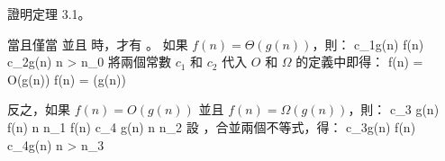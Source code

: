 \startEXERCISE
證明定理 3.1。

當且僅當  並且  時，才有 。
\stopEXERCISE
\startANSWER
如果 $f(n) = \Theta(g(n))$，則：
 \le c_1g(n) \le f(n) \le c_2g(n) \quad {} n > n_0
\stopformula
將兩個常數 $c_1$ 和 $c_2$ 代入 $O$ 和 $\Omega$ 的定義中即得：
\startsplitformula\startalign
\NC f(n) \NC = O(g(n)) \NR
\NC f(n) \NC = \Omega(g(n)) \NR
\stopalign\stopsplitformula

反之，如果 $f(n) = O(g(n))$ 並且 $f(n) = \Omega(g(n))$，則：
\startsplitformula\startalign
{} \le c_3 g(n) \le f(n) \NC \quad {} n \ge n_1 \NR
{} \le f(n) \le c_4 g(n) \NC \quad {} n \ge n_2 \NR
\stopalign\stopsplitformula
設 ，合並兩個不等式，得：
 \leq c_3g(n) \leq f(n) \leq c_4g(n) \quad {} n > n_3
\stopformula
\stopANSWER
